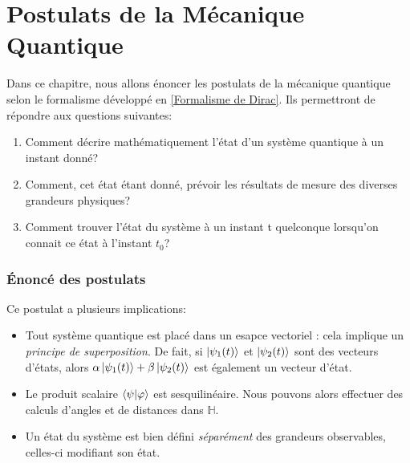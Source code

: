 \documentclass[../notesdecours.tex]{subfiles}
\begin{document}
\newpage
\part{Postulats de la Mécanique Quantique}
\label{Postulats de la Mecanique Quantique}
Dans ce chapitre, nous allons énoncer les postulats de la mécanique quantique selon le formalisme développé en \ref{Formalisme de Dirac}. Ils permettront de répondre aux questions suivantes:
\begin{enumerate}
\item Comment décrire mathématiquement l'état d'un système quantique à un instant donné?
\item Comment, cet état étant donné, prévoir les résultats de mesure des diverses grandeurs physiques?
\item Comment trouver l'état du système à un instant t quelconque lorsqu'on connait  ce état à l'instant $t_0$?
\end{enumerate}
\section{Énoncé des postulats}

\begin{center}
\end{center}
Ce postulat a plusieurs implications:
\begin{itemize}
\item Tout système quantique est placé dans un esapce vectoriel : cela implique un \textit{principe de superposition}. De fait, si $\ket{\psi_1 (t)}$ et $\ket{\psi_2 (t)}$ sont des vecteurs d'états, alors $\alpha \ket{\psi_1 (t)} + \beta\ket{\psi_2 (t)}$ est également un vecteur d'état.
\item Le produit scalaire $\braket{\psi|\varphi}$ est sesquilinéaire. Nous pouvons alors effectuer des calculs d'angles et de distances dans $\mathbb{H}$.
\item Un état du système est bien défini \textit{séparément} des grandeurs observables, celles-ci modifiant son état.
\end{itemize}
\end{document}
